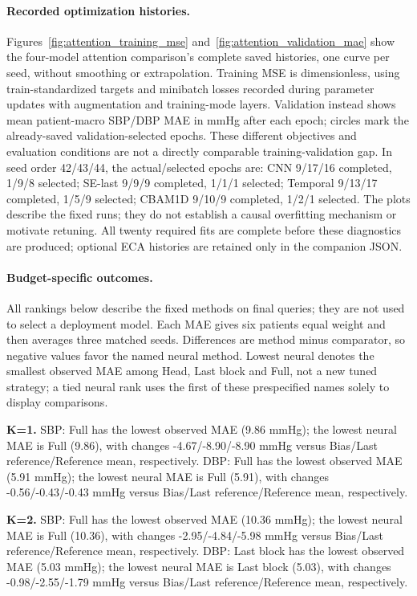 \documentclass[11pt]{article}
\begin{document}
\paragraph{Recorded optimization histories.} Figures~\ref{fig:attention_training_mse} and~\ref{fig:attention_validation_mae} show the four-model attention comparison's complete saved histories, one curve per seed, without smoothing or extrapolation. Training MSE is dimensionless, using train-standardized targets and minibatch losses recorded during parameter updates with augmentation and training-mode layers. Validation instead shows mean patient-macro SBP/DBP MAE in mmHg after each epoch; circles mark the already-saved validation-selected epochs. These different objectives and evaluation conditions are not a directly comparable training-validation gap. In seed order 42/43/44, the actual/selected epochs are: CNN 9/17/16 completed, 1/9/8 selected; SE-last 9/9/9 completed, 1/1/1 selected; Temporal 9/13/17 completed, 1/5/9 selected; CBAM1D 9/10/9 completed, 1/2/1 selected. The plots describe the fixed runs; they do not establish a causal overfitting mechanism or motivate retuning. All twenty required fits are complete before these diagnostics are produced; optional ECA histories are retained only in the companion JSON.

\paragraph{Budget-specific outcomes.}

All rankings below describe the fixed methods on final queries; they are not used to select a deployment model. Each MAE gives six patients equal weight and then averages three matched seeds. Differences are method minus comparator, so negative values favor the named neural method. Lowest neural denotes the smallest observed MAE among Head, Last block and Full, not a new tuned strategy; a tied neural rank uses the first of these prespecified names solely to display comparisons.

\textbf{K=1.} SBP: Full has the lowest observed MAE (9.86 mmHg); the lowest neural MAE is Full (9.86), with changes -4.67/-8.90/-8.90 mmHg versus Bias/Last reference/Reference mean, respectively. DBP: Full has the lowest observed MAE (5.91 mmHg); the lowest neural MAE is Full (5.91), with changes -0.56/-0.43/-0.43 mmHg versus Bias/Last reference/Reference mean, respectively.

\textbf{K=2.} SBP: Full has the lowest observed MAE (10.36 mmHg); the lowest neural MAE is Full (10.36), with changes -2.95/-4.84/-5.98 mmHg versus Bias/Last reference/Reference mean, respectively. DBP: Last block has the lowest observed MAE (5.03 mmHg); the lowest neural MAE is Last block (5.03), with changes -0.98/-2.55/-1.79 mmHg versus Bias/Last reference/Reference mean, respectively.
\end{document}
